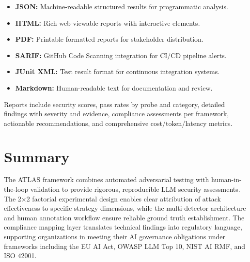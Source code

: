 \documentclass[12pt,a4paper]{report}
\begin{document}
\begin{itemize}
    \item \textbf{JSON:} Machine-readable structured results for programmatic analysis.
    \item \textbf{HTML:} Rich web-viewable reports with interactive elements.
    \item \textbf{PDF:} Printable formatted reports for stakeholder distribution.
    \item \textbf{SARIF:} GitHub Code Scanning integration for CI/CD pipeline alerts.
    \item \textbf{JUnit XML:} Test result format for continuous integration systems.
    \item \textbf{Markdown:} Human-readable text for documentation and review.
\end{itemize}

Reports include security scores, pass rates by probe and category, detailed findings with severity and evidence, compliance assessments per framework, actionable recommendations, and comprehensive cost/token/latency metrics.

\section{Summary}

The ATLAS framework combines automated adversarial testing with human-in-the-loop validation to provide rigorous, reproducible LLM security assessments. The 2$\times$2 factorial experimental design enables clear attribution of attack effectiveness to specific strategy dimensions, while the multi-detector architecture and human annotation workflow ensure reliable ground truth establishment. The compliance mapping layer translates technical findings into regulatory language, supporting organizations in meeting their AI governance obligations under frameworks including the EU AI Act, OWASP LLM Top 10, NIST AI RMF, and ISO 42001.
\end{document}
